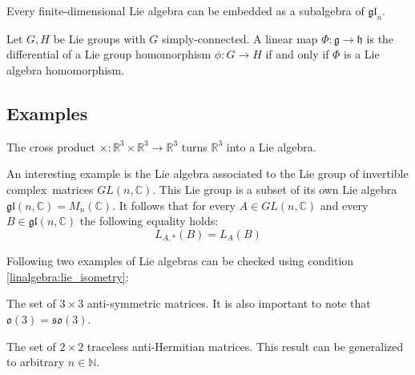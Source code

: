 	\begin{theorem}
		Every finite-dimensional Lie algebra can be embedded as a subalgebra of $\mathfrak{gl}_n$.
	\end{theorem}
	
	\begin{property}
		\label{lie:prop_hom}
		Let $G, H$ be Lie groups with $G$ simply-connected. A linear map $\Phi:\mathfrak{g}\rightarrow\mathfrak{h}$ is the differential of a Lie group homomorphism $\phi:G\rightarrow H$ if and only if $\Phi$ is a Lie algebra homomorphism.
	\end{property}

\subsection{Examples}
        \begin{example}
        	The cross product $\times:\mathbb{R}^3\times\mathbb{R}^3\rightarrow\mathbb{R}^3$ turns $\mathbb{R}^3$ into a Lie algebra.
        \end{example}
        \begin{example}
        	An interesting example is the Lie algebra associated to the Lie group of invertible complex\footnotemark\ matrices $GL(n, \mathbb{C})$. This Lie group is a subset of its own Lie algebra $\mathfrak{gl}(n, \mathbb{C}) = M_n(\mathbb{C})$. It follows that for every $A\in GL(n, \mathbb{C})$ and every $B\in\mathfrak{gl}(n, \mathbb{C})$ the following equality holds:
        	\begin{equation}
        		L_{A,\ast}(B) = L_A(B)
        	\end{equation}
        \end{example}
        
        Following two examples of Lie algebras can be checked using condition \ref{linalgebra:lie_isometry}:
        \begin{example}
        	The set of $3\times3$ anti-symmetric matrices. It is also important to note that $\mathfrak{o}(3) = \mathfrak{so}(3)$.
        \end{example}
        \begin{example}
        	The set of $2\times2$ traceless anti-Hermitian matrices. This result can be generalized to arbitrary $n\in\mathbb{N}$.
        \end{example}

